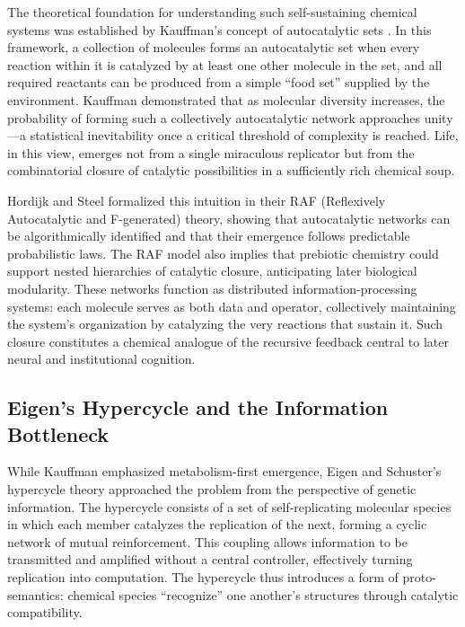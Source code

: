 \documentclass[11pt,a4paper]{article}
\begin{document}
The theoretical foundation for understanding such self-sustaining chemical systems was established by Kauffman’s concept of autocatalytic sets \citep{Kauffman1986AutocatalyticSets, Kauffman1993OriginsOfOrder}.  In this framework, a collection of molecules forms an autocatalytic set when every reaction within it is catalyzed by at least one other molecule in the set, and all required reactants can be produced from a simple “food set” supplied by the environment.  Kauffman demonstrated that as molecular diversity increases, the probability of forming such a collectively autocatalytic network approaches unity---a statistical inevitability once a critical threshold of complexity is reached.  Life, in this view, emerges not from a single miraculous replicator but from the combinatorial closure of catalytic possibilities in a sufficiently rich chemical soup.

Hordijk and Steel \citep{HordijkSteel2012RAF} formalized this intuition in their RAF (Reflexively Autocatalytic and F-generated) theory, showing that autocatalytic networks can be algorithmically identified and that their emergence follows predictable probabilistic laws.  The RAF model also implies that prebiotic chemistry could support nested hierarchies of catalytic closure, anticipating later biological modularity.  These networks function as distributed information-processing systems: each molecule serves as both data and operator, collectively maintaining the system’s organization by catalyzing the very reactions that sustain it.  Such closure constitutes a chemical analogue of the recursive feedback central to later neural and institutional cognition.

\subsection{Eigen’s Hypercycle and the Information Bottleneck}

While Kauffman emphasized metabolism-first emergence, Eigen and Schuster’s hypercycle theory \citep{Eigen1971Selforganization, Eigen1979HypercycleBook} approached the problem from the perspective of genetic information.  The hypercycle consists of a set of self-replicating molecular species in which each member catalyzes the replication of the next, forming a cyclic network of mutual reinforcement.  This coupling allows information to be transmitted and amplified without a central controller, effectively turning replication into computation.  The hypercycle thus introduces a form of proto-semantics: chemical species “recognize” one another’s structures through catalytic compatibility.
\end{document}
